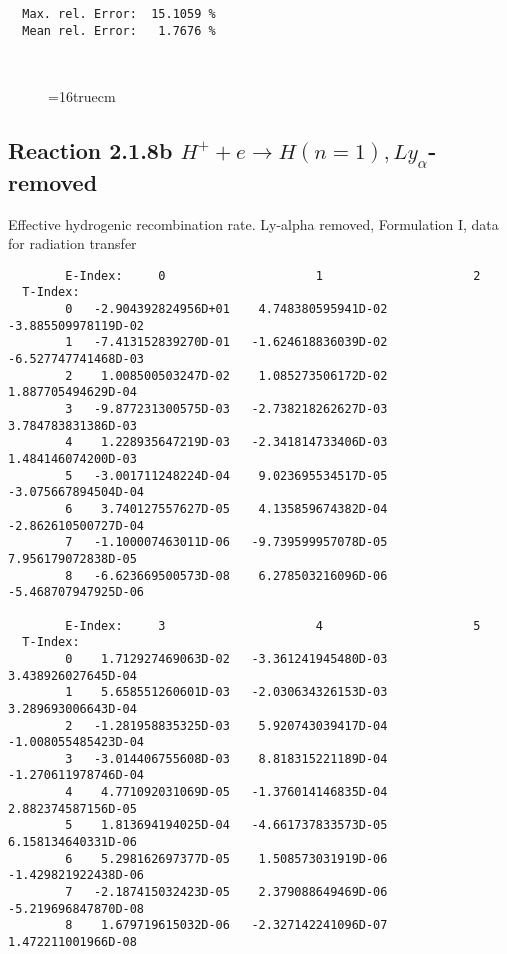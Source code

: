 \documentclass[12pt]{article}
\begin{document}
\begin{small}
\begin{verbatim}
  Max. rel. Error:  15.1059 %
  Mean rel. Error:   1.7676 %



\end{verbatim}\end{small}
\begin{figure} \label{2.1.8a}
\epsfxsize=16truecm
\end{figure}
\newpage
\subsection{
Reaction 2.1.8b  $H^+ + e \rightarrow H(n=1), Ly_\alpha$-removed
}


   Effective hydrogenic recombination rate.
   Ly-alpha removed, Formulation I, data for radiation transfer

\begin{small}\begin{verbatim}
        E-Index:     0                     1                     2
  T-Index:
        0   -2.904392824956D+01    4.748380595941D-02   -3.885509978119D-02
        1   -7.413152839270D-01   -1.624618836039D-02   -6.527747741468D-03
        2    1.008500503247D-02    1.085273506172D-02    1.887705494629D-04
        3   -9.877231300575D-03   -2.738218262627D-03    3.784783831386D-03
        4    1.228935647219D-03   -2.341814733406D-03    1.484146074200D-03
        5   -3.001711248224D-04    9.023695534517D-05   -3.075667894504D-04
        6    3.740127557627D-05    4.135859674382D-04   -2.862610500727D-04
        7   -1.100007463011D-06   -9.739599957078D-05    7.956179072838D-05
        8   -6.623669500573D-08    6.278503216096D-06   -5.468707947925D-06

        E-Index:     3                     4                     5
  T-Index:
        0    1.712927469063D-02   -3.361241945480D-03    3.438926027645D-04
        1    5.658551260601D-03   -2.030634326153D-03    3.289693006643D-04
        2   -1.281958835325D-03    5.920743039417D-04   -1.008055485423D-04
        3   -3.014406755608D-03    8.818315221189D-04   -1.270611978746D-04
        4    4.771092031069D-05   -1.376014146835D-04    2.882374587156D-05
        5    1.813694194025D-04   -4.661737833573D-05    6.158134640331D-06
        6    5.298162697377D-05    1.508573031919D-06   -1.429821922438D-06
        7   -2.187415032423D-05    2.379088649469D-06   -5.219696847870D-08
        8    1.679719615032D-06   -2.327142241096D-07    1.472211001966D-08


\end{verbatim}
\end{small}
\end{document}
